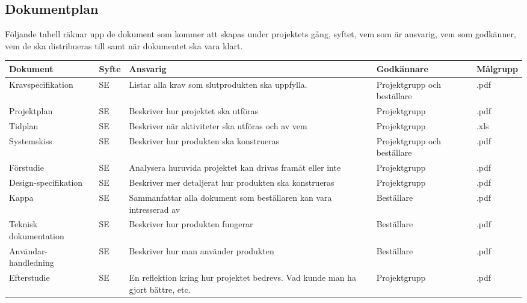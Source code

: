 \documentclass[11pt]{article}
\begin{document}
\begin{flushleft}

\pagebreak

\section{Dokumentplan}
Följande tabell räknar upp de dokument som kommer att skapas under projektets gång, syftet, vem som är ansvarig, vem som godkänner, vem de ska distribueras till samt när dokumentet ska vara klart.
\begin{center}
\begin{longtable}{|p{.24\linewidth}|p{.08\linewidth}|p{.25\linewidth}|p{.19\linewidth}|p{.15\linewidth}|}\hline
\textbf{Dokument} & \textbf{Syfte} & \textbf{Ansvarig} & \textbf{Godkännare} & \textbf{Målgrupp} \\ \hline

Kravspecifikation & SE & Listar alla krav som slutprodukten ska uppfylla. & Projektgrupp och beställare & .pdf \\ \hline
Projektplan & SE & Beskriver hur projektet ska utföras & Projektgrupp & .pdf \\ \hline
Tidplan & SE & Beskriver när aktiviteter ska utföras och av vem & Projektgrupp & .xls \\ \hline
Systemskiss & SE & Beskriver hur produkten ska konstrueras& Projektgrupp och beställare & .pdf \\ \hline
Förstudie & SE & Analysera huruvida projektet kan drivas framåt eller inte & Projektgrupp & .pdf \\ \hline
Design-specifikation & SE & Beskriver mer detaljerat hur produkten ska konstrueras & Projektgrupp & .pdf \\ \hline
Kappa & SE & Sammanfattar alla dokument som beställaren kan vara intresserad av & Beställare & .pdf \\ \hline
Teknisk dokumentation & SE & Beskriver hur produkten fungerar & Beställare & .pdf \\ \hline
Användar-handledning & SE & Beskriver hur man använder produkten& Beställare & .pdf \\ \hline
Efterstudie & SE & En reflektion kring hur projektet bedrevs. Vad kunde man ha gjort bättre, etc.& Projektgrupp & .pdf \\ \hline


\end{longtable}
\end{center}
\end{flushleft}
\end{document}
